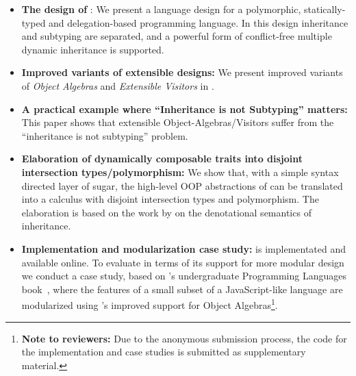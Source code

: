 \begin{itemize}

\item {\bf The design of \name}: We present a language design for a polymorphic,
  statically-typed and delegation-based programming language. In this design
  inheritance and subtyping are separated, and a powerful form of conflict-free
  multiple dynamic inheritance is supported.

\item {\bf Improved variants of extensible designs:} We present
  improved variants of \emph{Object
    Algebras} and \emph{Extensible Visitors} in \name. 

\item {\bf A practical example where ``Inheritance is not Subtyping'' matters:}
  This paper shows that extensible Object-Algebras/Visitors suffer from the
  ``inheritance is not subtyping'' problem.

\item {\bf Elaboration of dynamically composable traits into disjoint
    intersection types/polymorphism:} We show that, with a simple syntax directed layer of
  sugar, the high-level OOP abstractions of \name can be translated into a
  calculus with disjoint intersection types and polymorphism. The elaboration is
  based on the work by \citet{cook1989denotational} on the denotational semantics of
  inheritance.

\item {\bf Implementation and modularization case study:} \name is implementated
  and available online. To evaluate \name in terms of its support for more
  modular design we conduct a case study, based on \citeauthor{poplcook}'s undergraduate
  Programming Languages book~\cite{poplcook}, where the features of a small
  subset of a JavaScript-like language are modularized using \name's improved
  support for Object Algebras\footnote{{\bf Note to reviewers:} Due to the
    anonymous submission process, the code for the implementation and case
    studies is submitted as supplementary material.}.

\end{itemize}

